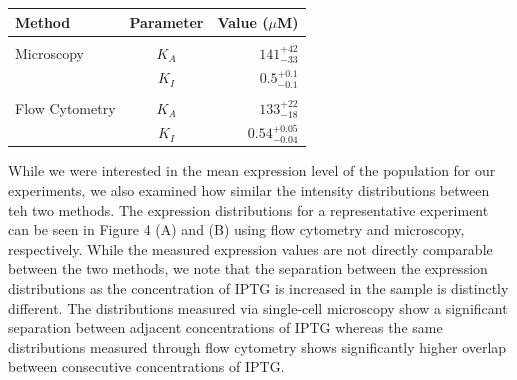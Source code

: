 \documentclass[letterpaper, 10pt]{article}
\begin{document}
\begin{table}
\begin{tabular}{lcr}
  \textbf{Method} & \textbf{Parameter} & \textbf{Value ($\mu$M)}\\
  \hline\\
  Microscopy & $K_A$ & $141^{+42}_{-33}$\\
   & $K_I$ & $0.5^{+0.1}_{-0.1}$\\
  \hline \\
  Flow Cytometry & $K_A$ & $133^{+22}_{-18}$\\
  & $K_I$ & $0.54^{+0.05}_{-0.04}$\\
  \hline
\end{tabular}
\end{table}

\begin{figure}
  \label{fig:parameter_estimation}
\end{figure}

While we were interested in the mean expression level of the population for our
experiments, we also examined how similar the intensity distributions between
teh two methods. The expression distributions for a representative experiment
can be seen in Figure 4 (A) and (B) using flow cytometry and microscopy,
respectively. While the measured expression values are not directly comparable
between the two methods, we note that the separation between the expression
distributions as the concentration of IPTG is increased in the sample is distinctly
different. The distributions measured via single-cell microscopy show a significant
separation between adjacent concentrations of IPTG whereas the same distributions
measured through flow cytometry shows significantly higher overlap between
consecutive concentrations of IPTG.
\end{document}
